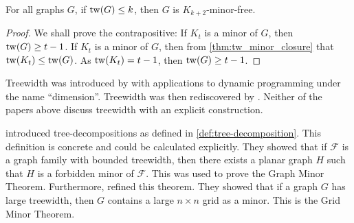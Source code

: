 

\begin{proposition}\label{thm:treewidth_clique-minor-free}
	For all graphs $G$, if \(\operatorname{tw}(G) \leq k\), then \(G\) is \(K_{k+2}\)-minor-free.
\end{proposition}
\begin{proof}
	We shall prove the contrapositive: If \(K_t\) is a minor of \(G\), then \(\operatorname{tw}(G) \geq t-1\).
	If \(K_t\) is a minor of \(G\), then from \cref{thm:tw_minor_closure} that \(\operatorname{tw}(K_t) \leq \operatorname{tw}(G)\). As \(\operatorname{tw}(K_t) = t-1\), then \(\operatorname{tw}(G) \geq t - 1\).
\end{proof}

Treewidth was introduced by \textcite{berteleChapterEliminationVariables1972} with applications to dynamic programming under the name ``dimension''. Treewidth was then rediscovered by \textcite{halinSfunctionsGraphs1976}. Neither of the papers above discuss treewidth with an explicit construction.

\textcite{robertsonGraphMinorsIII1984} introduced tree-decompositions as defined in \cref{def:tree-decomposition}. This definition is concrete and could be calculated explicitly. They showed that if $\mathcal{F}$ is a graph family with bounded treewidth, then there exists a planar graph $H$ such that $H$ is a forbidden minor of $\mathcal{F}$. This was used to prove the Graph Minor Theorem. Furthermore, \textcite{robertsonQuicklyExcludingPlanar1994} refined this theorem. They showed that if a graph $G$ has large treewidth, then $G$ contains a large $n \times n$ grid as a minor. This is the Grid Minor Theorem.